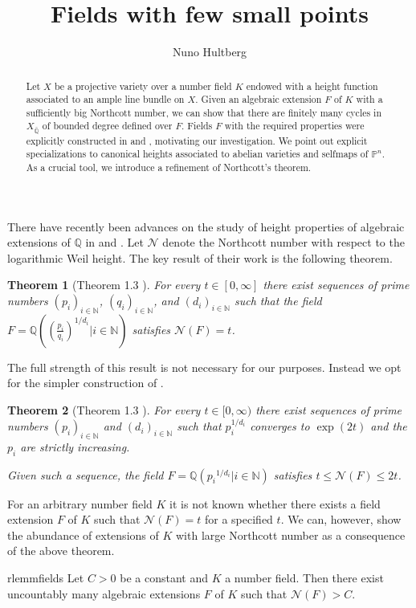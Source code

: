 \documentclass[11pt, a4paper, UKenglish]{amsart}
\title{Fields with few small points}
\author{Nuno Hultberg}
\newcommand{\N}{\mathcal N}
\newcommand{\Q}{\mathbb{Q}}
\newcommand{\Qbar}{\bar{\mathbb{Q}}}
\newcommand{\bbN}{\mathbb{N}}
\newcommand{\bbP}{\mathbb{P}}
\newtheorem{thm_}{Theorem}[section]
\theoremstyle{definition}
\newcommand{\thm}[1]{\begin{thm_}#1\end{thm_}}
\begin{document}
\maketitle

\begin{abstract}
Let $X$ be a projective variety over a number field $K$ endowed with a height function associated to an ample line bundle on $X$. Given an algebraic extension $F$ of $K$ with a sufficiently big Northcott number, we can show that there are finitely many cycles in $X_{\Qbar}$ of bounded degree defined over $F$. Fields $F$ with the required properties were explicitly constructed in \cite{fab} and \cite{oksa}, motivating our investigation. We point out explicit specializations to canonical heights associated to abelian varieties and selfmaps of $\bbP^n$. As a crucial tool, we introduce a refinement of Northcott's theorem.
\end{abstract}

There have recently been advances on the study of height properties of algebraic extensions of $\Q$ in \cite{fab} and \cite{oksa}. Let $\N$ denote the Northcott number with respect to the logarithmic Weil height. The key result of their work is the following theorem.

\thm{[Theorem 1.3 \cite{oksa}]\label{fields}For every $t \in [0,\infty]$ there exist sequences of prime numbers $(p_i)_{i \in \bbN}$, $(q_i)_{i \in \bbN}$, and $(d_i)_{i \in \bbN}$ such that the field $F = \Q((\frac{p_i}{q_i})^{1/d_i}| i \in \bbN)$ satisfies $\N(F) = t$.
}

The full strength of this result is not necessary for our purposes. Instead we opt for the simpler construction of \cite{fab}.

\thm{[Theorem 1.3 \cite{fab}]\label{fab}For every $t \in [0,\infty)$ there exist sequences of prime numbers $(p_i)_{i \in \bbN}$ and $(d_i)_{i \in \bbN}$ such that $p_i^{1/d_i}$ converges to $\exp(2t)$ and the $p_i$ are strictly increasing.

Given such a sequence, the field $F = \Q({p_i}^{1/d_i}| i \in \bbN)$ satisfies $t \leq \N(F) \leq 2t$.
}
For an arbitrary number field $K$ it is not known whether there exists a field extension $F$ of $K$ such that $\N(F) = t$ for a specified $t$. We can, however, show the abundance of extensions of $K$ with large Northcott number as a consequence of the above theorem.

\begin{restatable}{rlemm}{fields}
\label{plenty}
Let $C >0$ be a constant and $K$ a number field. Then there exist uncountably many algebraic extensions $F$ of $K$ such that $\N(F) > C$.
\end{restatable}
\end{document}
